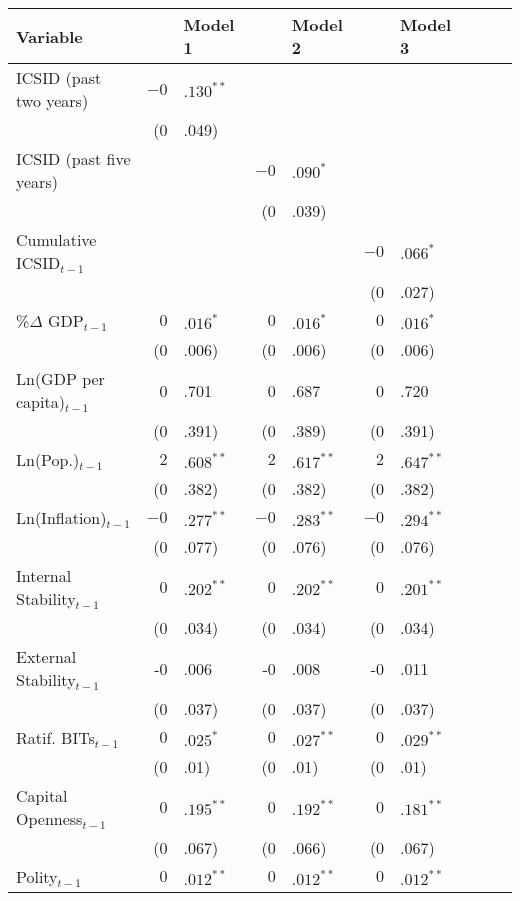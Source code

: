 \documentclass[12pt,onesided]{amsart}
\begin{document}
\begin{table}[ht]
\centering
{\footnotesize
\begin{tabular}{lr@{} lr@{}lr@{}lr@{}lr@{}}
 Variable && Model 1 && Model 2 && Model 3 \\ 
  \hline
\hline
ICSID (past two years) & $-0$&$.130^{\ast\ast}$ &&  &&  \\ 
   & (0&.049) &&  &&  \\ 
  ICSID (past five years) &&  & $-0$&$.090^{\ast}$ &&  \\ 
   &&  & (0&.039) &&  \\ 
  Cumulative ICSID$_{t-1}$ &&  &&  & $-0$&$.066^{\ast}$ \\ 
   &&  &&  & (0&.027) \\ 
  \%$\Delta$ GDP$_{t-1}$ & $0$&$.016^{\ast}$ & $0$&$.016^{\ast}$ & $0$&$.016^{\ast}$ \\ 
   & (0&.006) & (0&.006) & (0&.006) \\ 
  Ln(GDP per capita)$_{t-1}$ & 0&.701 & 0&.687 & 0&.720 \\ 
   & (0&.391) & (0&.389) & (0&.391) \\ 
  Ln(Pop.)$_{t-1}$ & $2$&$.608^{\ast\ast}$ & $2$&$.617^{\ast\ast}$ & $2$&$.647^{\ast\ast}$ \\ 
   & (0&.382) & (0&.382) & (0&.382) \\ 
  Ln(Inflation)$_{t-1}$ & $-0$&$.277^{\ast\ast}$ & $-0$&$.283^{\ast\ast}$ & $-0$&$.294^{\ast\ast}$ \\ 
   & (0&.077) & (0&.076) & (0&.076) \\ 
  Internal Stability$_{t-1}$ & $0$&$.202^{\ast\ast}$ & $0$&$.202^{\ast\ast}$ & $0$&$.201^{\ast\ast}$ \\ 
   & (0&.034) & (0&.034) & (0&.034) \\ 
  External Stability$_{t-1}$ & -0&.006 & -0&.008 & -0&.011 \\ 
   & (0&.037) & (0&.037) & (0&.037) \\ 
  Ratif. BITs$_{t-1}$ & $0$&$.025^{\ast}$ & $0$&$.027^{\ast\ast}$ & $0$&$.029^{\ast\ast}$ \\ 
   & (0&.01) & (0&.01) & (0&.01) \\ 
  Capital Openness$_{t-1}$ & $0$&$.195^{\ast\ast}$ & $0$&$.192^{\ast\ast}$ & $0$&$.181^{\ast\ast}$ \\ 
   & (0&.067) & (0&.066) & (0&.067) \\ 
  Polity$_{t-1}$ & $0$&$.012^{\ast\ast}$ & $0$&$.012^{\ast\ast}$ & $0$&$.012^{\ast\ast}$ \\ 

\end{tabular}}
\end{table}
\end{document}
